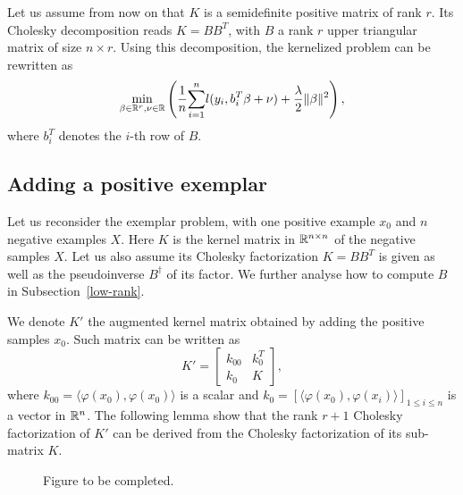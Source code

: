 
Let us assume from now on that $K$ is a semidefinite positive matrix
of rank $r$. Its Cholesky decomposition reads $K=BB^T$, with $B$ a rank $r$ upper triangular matrix of size $n\times r$. Using this decomposition, the kernelized problem can be rewritten as 
\begin{equation}
\min_{\beta\in\mathbb R^r,\nu\in\mathbb R} \left( \dfrac{1}{n}\displaystyle{\sum_{i=1}^n} l(y_i, b_i^T\beta+\nu)+\dfrac{\lambda}{2}\|\beta\|^2\right), \label{beta:first}
\end{equation}
where $b_i^T$ denotes the $i$-th row of $B$.

\subsection{Adding a positive exemplar}
\label{subsec:adding}
Let us reconsider the exemplar problem, with one positive example $x_0$ and $n$ negative examples $X$. Here $K$ is the kernel matrix in $\mathbb R^{n\times n}$ of the negative samples $X$. 
Let us also assume its Cholesky factorization $K=BB^T$ is given as well as the pseudoinverse $B^\dagger$ of its factor. We further analyse how to compute $B$ in Subsection~\ref{low-rank}.

We denote $K'$ the augmented kernel matrix obtained by adding the positive samples $x_0$. Such matrix can be written as
\begin{equation}
K' = \begin{bmatrix}
k_{00} & k_0^T\\
k_0 & K
\end{bmatrix},
\end{equation}
where $k_{00}=\langle \varphi(x_0),\varphi(x_0)\rangle$ is a scalar and $k_0= [\langle \varphi(x_0),\varphi(x_i)\rangle]_{1\le i\le n}$ is a vector in $\mathbb R^n$. 
The following lemma show that the rank $r+1$ Cholesky factorization of $K'$ can be derived from the Cholesky factorization of its sub-matrix $K$.

\begin{figure}[!h]
\centering
\caption{Figure to be completed.}
\label{proj}
\end{figure}

